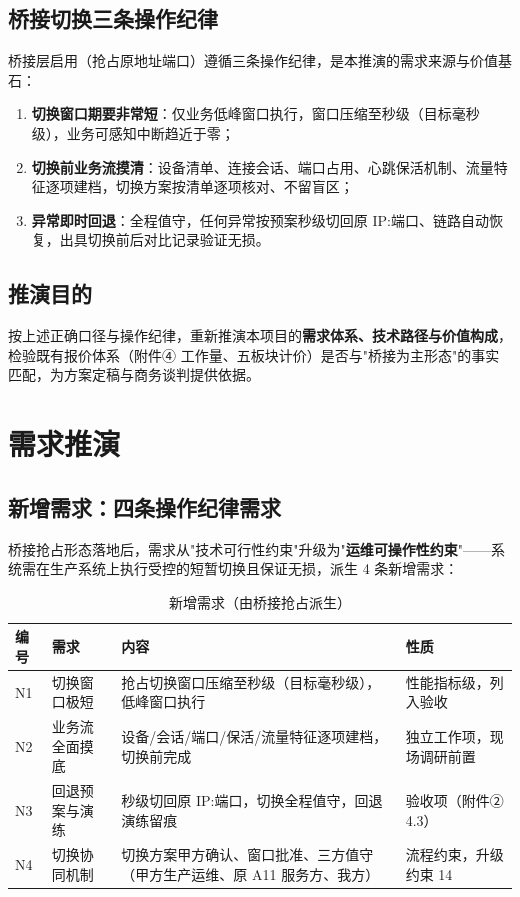 \documentclass[11pt,a4paper]{ctexart}
\begin{document}
\subsection{桥接切换三条操作纪律}

桥接层启用（抢占原地址端口）遵循三条操作纪律，是本推演的需求来源与价值基石：

\begin{enumerate}[leftmargin=*]
  \item \textbf{切换窗口期要非常短}：仅业务低峰窗口执行，窗口压缩至秒级（目标毫秒级），业务可感知中断趋近于零；
  \item \textbf{切换前业务流摸清}：设备清单、连接会话、端口占用、心跳保活机制、流量特征逐项建档，切换方案按清单逐项核对、不留盲区；
  \item \textbf{异常即时回退}：全程值守，任何异常按预案秒级切回原 IP:端口、链路自动恢复，出具切换前后对比记录验证无损。
\end{enumerate}

\subsection{推演目的}

按上述正确口径与操作纪律，重新推演本项目的\textbf{需求体系、技术路径与价值构成}，检验既有报价体系（附件④ 工作量、五板块计价）是否与"桥接为主形态"的事实匹配，为方案定稿与商务谈判提供依据。

\section{需求推演}

\subsection{新增需求：四条操作纪律需求}

桥接抢占形态落地后，需求从"技术可行性约束"升级为"\textbf{运维可操作性约束}"——系统需在生产系统上执行受控的短暂切换且保证无损，派生 4 条新增需求：

\begin{table}[H]\centering
\caption{新增需求（由桥接抢占派生）}
\begin{tabular}{p{1.0cm} p{3.4cm} p{4.6cm} p{3.8cm}}
\toprule
\textbf{编号} & \textbf{需求} & \textbf{内容} & \textbf{性质} \\
\midrule
N1 & 切换窗口极短 & 抢占切换窗口压缩至秒级（目标毫秒级），低峰窗口执行 & 性能指标级，列入验收 \\
N2 & 业务流全面摸底 & 设备/会话/端口/保活/流量特征逐项建档，切换前完成 & 独立工作项，现场调研前置 \\
N3 & 回退预案与演练 & 秒级切回原 IP:端口，切换全程值守，回退演练留痕 & 验收项（附件② 4.3） \\
N4 & 切换协同机制 & 切换方案甲方确认、窗口批准、三方值守（甲方生产运维、原 A11 服务方、我方） & 流程约束，升级约束 14 \\
\bottomrule
\end{tabular}
\end{table}
\end{document}
